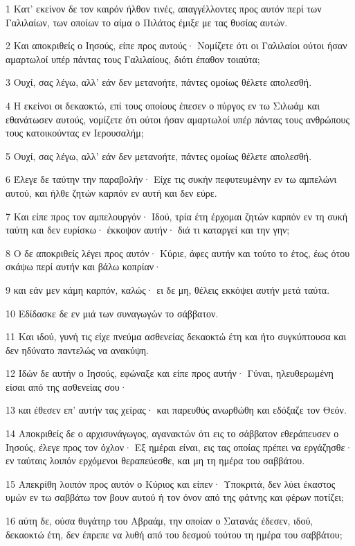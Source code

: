 \par 1 Κατ' εκείνον δε τον καιρόν ήλθον τινές, απαγγέλλοντες προς αυτόν περί των Γαλιλαίων, των οποίων το αίμα ο Πιλάτος έμιξε με τας θυσίας αυτών.
\par 2 Και αποκριθείς ο Ιησούς, είπε προς αυτούς· Νομίζετε ότι οι Γαλιλαίοι ούτοι ήσαν αμαρτωλοί υπέρ πάντας τους Γαλιλαίους, διότι έπαθον τοιαύτα;
\par 3 Ουχί, σας λέγω, αλλ' εάν δεν μετανοήτε, πάντες ομοίως θέλετε απολεσθή.
\par 4 Η εκείνοι οι δεκαοκτώ, επί τους οποίους έπεσεν ο πύργος εν τω Σιλωάμ και εθανάτωσεν αυτούς, νομίζετε ότι ούτοι ήσαν αμαρτωλοί υπέρ πάντας τους ανθρώπους τους κατοικούντας εν Ιερουσαλήμ;
\par 5 Ουχί, σας λέγω, αλλ' εάν δεν μετανοήτε, πάντες ομοίως θέλετε απολεσθή.
\par 6 Έλεγε δε ταύτην την παραβολήν· Είχε τις συκήν πεφυτευμένην εν τω αμπελώνι αυτού, και ήλθε ζητών καρπόν εν αυτή και δεν εύρε.
\par 7 Και είπε προς τον αμπελουργόν· Ιδού, τρία έτη έρχομαι ζητών καρπόν εν τη συκή ταύτη και δεν ευρίσκω· έκκοψον αυτήν· διά τι καταργεί και την γην;
\par 8 Ο δε αποκριθείς λέγει προς αυτόν· Κύριε, άφες αυτήν και τούτο το έτος, έως ότου σκάψω περί αυτήν και βάλω κοπρίαν·
\par 9 και εάν μεν κάμη καρπόν, καλώς· ει δε μη, θέλεις εκκόψει αυτήν μετά ταύτα.
\par 10 Εδίδασκε δε εν μιά των συναγωγών το σάββατον.
\par 11 Και ιδού, γυνή τις είχε πνεύμα ασθενείας δεκαοκτώ έτη και ήτο συγκύπτουσα και δεν ηδύνατο παντελώς να ανακύψη.
\par 12 Ιδών δε αυτήν ο Ιησούς, εφώναξε και είπε προς αυτήν· Γύναι, ηλευθερωμένη είσαι από της ασθενείας σου·
\par 13 και έθεσεν επ' αυτήν τας χείρας· και παρευθύς ανωρθώθη και εδόξαζε τον Θεόν.
\par 14 Αποκριθείς δε ο αρχισυνάγωγος, αγανακτών ότι εις το σάββατον εθεράπευσεν ο Ιησούς, έλεγε προς τον όχλον· Εξ ημέραι είναι, εις τας οποίας πρέπει να εργάζησθε· εν ταύταις λοιπόν ερχόμενοι θεραπεύεσθε, και μη τη ημέρα του σαββάτου.
\par 15 Απεκρίθη λοιπόν προς αυτόν ο Κύριος και είπεν· Υποκριτά, δεν λύει έκαστος υμών εν τω σαββάτω τον βουν αυτού ή τον όνον από της φάτνης και φέρων ποτίζει;
\par 16 αύτη δε, ούσα θυγάτηρ του Αβραάμ, την οποίαν ο Σατανάς έδεσεν, ιδού, δεκαοκτώ έτη, δεν έπρεπε να λυθή από του δεσμού τούτου τη ημέρα του σαββάτου;
